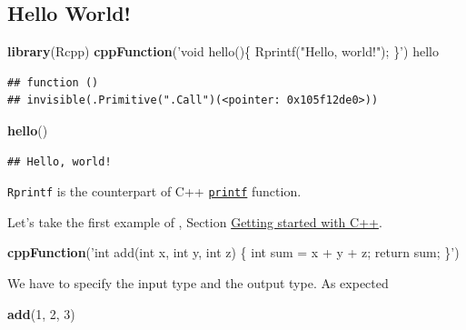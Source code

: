 \documentclass[]{book}
\newenvironment{Shaded}{\begin{snugshade}}{\end{snugshade}}
\newcommand{\KeywordTok}[1]{\textcolor[rgb]{0.13,0.29,0.53}{\textbf{#1}}}
\newcommand{\DecValTok}[1]{\textcolor[rgb]{0.00,0.00,0.81}{#1}}
\newcommand{\StringTok}[1]{\textcolor[rgb]{0.31,0.60,0.02}{#1}}
\newcommand{\NormalTok}[1]{#1}
\theoremstyle{definition}
\theoremstyle{definition}
\theoremstyle{definition}
\theoremstyle{remark}
\begin{document}
\subsection{Hello World!}\label{hello-world}

\begin{Shaded}
\begin{Highlighting}[]
\KeywordTok{library}\NormalTok{(Rcpp)}
\KeywordTok{cppFunction}\NormalTok{(}\StringTok{'void hello()\{}
\StringTok{  Rprintf("Hello, world!");}
\StringTok{\}'}\NormalTok{)}
\NormalTok{hello}
\end{Highlighting}
\end{Shaded}

\begin{verbatim}
## function () 
## invisible(.Primitive(".Call")(<pointer: 0x105f12de0>))
\end{verbatim}

\begin{Shaded}
\begin{Highlighting}[]
\KeywordTok{hello}\NormalTok{()}
\end{Highlighting}
\end{Shaded}

\begin{verbatim}
## Hello, world!
\end{verbatim}

\texttt{Rprintf} is the counterpart of C++
\href{http://www.cplusplus.com/reference/cstdio/printf/}{\texttt{printf}}
function.

Let's take the first example of \citet{Wickham2014}, Section
\href{http://adv-r.had.co.nz/Rcpp.html\#rcpp-intro}{Getting started with
C++}.

\begin{Shaded}
\begin{Highlighting}[]
\KeywordTok{cppFunction}\NormalTok{(}\StringTok{'int add(int x, int y, int z) \{}
\StringTok{  int sum = x + y + z;}
\StringTok{  return sum;}
\StringTok{\}'}\NormalTok{)}
\end{Highlighting}
\end{Shaded}

We have to specify the input type and the output type. As expected

\begin{Shaded}
\begin{Highlighting}[]
\KeywordTok{add}\NormalTok{(}\DecValTok{1}\NormalTok{, }\DecValTok{2}\NormalTok{, }\DecValTok{3}\NormalTok{)}
\end{Highlighting}
\end{Shaded}
\end{document}
